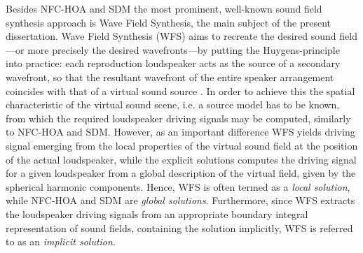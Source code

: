 Besides NFC-HOA and SDM the most prominent, well-known sound field synthesis approach is Wave Field Synthesis, the main subject of the present dissertation.
Wave Field Synthesis (WFS) aims to recreate the desired sound field---or more precisely the desired wavefronts---by putting the Huygens-principle into practice: 
each reproduction loudspeaker acts as the source of a secondary wavefront, so that the resultant wavefront of the entire speaker arrangement coincides with that of a virtual sound source \cite{Berkhout1993:Acoustic_control_by_WFS, Verheijen1997:phd, Ahrens2012}.
In order to achieve this the spatial characteristic of the virtual sound scene, i.e. a source model has to be known, from which the required loudspeaker driving signals may be computed, similarly to NFC-HOA and SDM.
However, as an important difference WFS yields driving signal emerging from the local properties of the virtual sound field at the position of the actual loudspeaker, while the explicit solutions computes the driving signal for a given loudspeaker from a global description of the virtual field, given by the spherical harmonic components.
Hence, WFS is often termed as a \emph{local solution}, while NFC-HOA and SDM are \emph{global solutions}.
Furthermore, since WFS extracts the loudspeaker driving signals from an appropriate boundary integral representation of sound fields, containing the solution implicitly, WFS is referred to as an \emph{implicit solution}.


